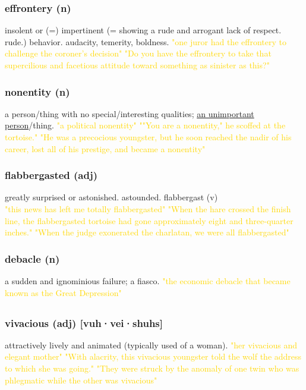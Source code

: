 \documentclass{proc}
\begin{document}
	\subsubsection{\textcolor{brickred}{effrontery} (n)}
	insolent or (=) impertinent (= showing a rude and arrogant lack of respect. rude.) behavior. audacity,
	temerity,
	boldness.
	\textcolor{gold}{"one juror had the effrontery to challenge the coroner's decision" "Do you have the effrontery to take that supercilious and facetious attitude toward something as sinister as this?"}
	
	\subsubsection{\textcolor{brickred}{nonentity} (n)}
	a person/thing with no special/interesting qualities; \underline{an unimportant person}/thing.
	\textcolor{gold}{"a political nonentity" ""You are a nonentity," he scoffed at the tortoise." "He was a precocious youngster, but he soon reached the nadir of his career, lost all of his prestige, and became a nonentity"}
	
	\subsubsection{\textcolor{brickred}{flabbergasted} (adj)}
	greatly surprised or astonished. astounded.
	flabbergast (v)\\
	\textcolor{gold}{"this news has left me totally flabbergasted" "When the hare crossed the finish line, the flabbergasted tortoise had gone approximately eight and three-quarter inches." "When the judge exonerated the charlatan, we were all flabbergasted"}
	
	\subsubsection{\textcolor{brickred}{debacle} (n)}
	a sudden and ignominious failure; a fiasco.
	\textcolor{gold}{"the economic debacle that became known as the Great Depression"}
	
	\newpage
	\subsection{}
	\subsubsection{\textcolor{brickred}{vivacious} (adj) [vuh·vei·shuhs]}
	attractively lively and animated (typically used of a woman).
	\textcolor{gold}{"her vivacious and elegant mother" "With alacrity, this vivacious youngster told the wolf the address to which she was going." "They were struck by the anomaly of one twin who was phlegmatic while the other
		was vivacious"}
	
\end{document}
